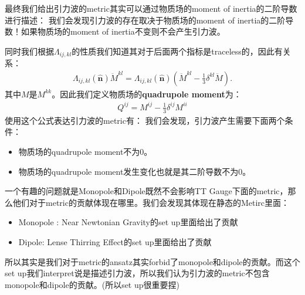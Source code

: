 \bigskip
{}

最终我们给出引力波的metric其实可以通过物质场的moment of inertia的二阶导数进行描述：
我们会发现引力波的存在取决于物质场的moment of inertia的二阶导数！如果物质场的moment of inertia不变则不会产生引力波。

同时我们根据$ \Lambda_{ij,kl} $的性质我们知道其对于后面两个指标是traceless的，因此有关系：
\begin{align}
  \Lambda_{ij,kl}(\hat{\mathbf{n}}) \ddot{M}^{kl} =
  \Lambda_{ij,kl}(\hat{\mathbf{n}}) \left( \ddot{M}^{kl} -
  \frac{1}{3} \delta^{kl} \ddot{M} \right).
\end{align}
其中$ M $是$ M^{kk} $。因此我们定义物质场的\textbf{quadrupole moment}为：
\begin{align}
  Q^{ij} = M^{ij} - \frac{1}{3} \delta^{ij} M^{ii}
\end{align}
使用这个公式表达引力波的metric有：
我们会发现，引力波产生需要下面两个条件：
\begin{itemize}
  \item 物质场的quadrupole moment不为0。
  \item 物质场的quadrupole moment发生变化也就是其二阶导数不为0。
\end{itemize}


\bigskip
{}

一个有趣的问题就是Monopole和Dipole既然不会影响TT
Gauge下面的metric，那么他们对于metric的贡献体现在哪里。我们会发现其体现在静态的Metirc里面：
\begin{itemize}
  \item Monopole : Near Newtonian Gravity的set up里面给出了贡献
  \item Dipole: Lense Thirring Effect的set up里面给出了贡献
\end{itemize}
所以其实是我们对于metric的ansatz其实forbid了monopole和dipole的贡献。而这个set
up我们interpret说是描述引力波，所以我们认为引力波的metric不包含monopole和dipole的贡献。(所以set up很重要捏)


